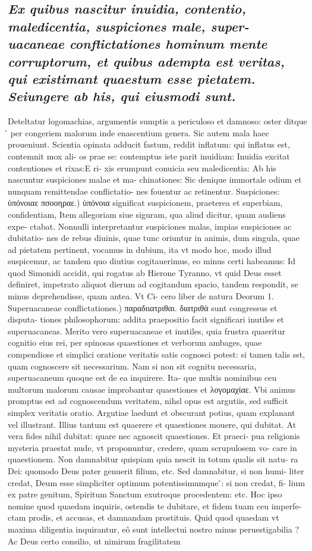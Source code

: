 \documentclass{article}
\begin{document}
\begin{pages}
\subsection*{\textit{Ex quibus nascitur inuidia, contentio, maledicentia, suspiciones male, super- uacaneae conflictationes hominum mente corruptorum, et quibus adempta est veritas, qui existimant quaestum esse pietatem. Seiungere ab his, qui eiusmodi sunt. }}\pstart Deteltatur logomachias, argumentis sumptis a periculoso et damnoso: oster ditque ́ per congeriem malorum inde enascentium genera. Sic autem mala haec proueniunt. Scientia opinata adducit fastum, reddit inflatum: qui inflatus est, contemnit mox ali- os prae se: contemptus iste parit inuidiam: Inuidia excitat contentiones et rixas:E ri- xis erumpunt conuicia seu maledicentia: Ab his nascuntur suspiciones malae et ma- chinationes: Sic denique immortale odium et nunquam remittendae conflictatio- nes fouentur ac retinentur.  \pend\pstart Suspiciones: ὑπόνοιαε πσοοηραε.) ύπόνοια significat suspicionem, praeterea et superbiam, confidentiam, Item allegoriam siue siguram, qua aliud dicitur, quam audiens expe- ctabat. Nonnulli interpretantur suspiciones malas, impias suspiciones ac dubitatio- nes de rebus diuinis, quae tunc oriuntur in animis, dum singula, quae ad pietatem pertinent, vocamus in dubium, ita vt modo hoc, modo illud suspicemur, ac tandem quo diutius cogitauerimus, eo minus certi habeamus: Id quod Simonidi accidit, qui rogatus ab Hierone Tyranno, vt quid Deus esset definiret, impetrato aliquot dierum ad cogitandum spacio, tandem respondit, se minus deprehendisse, quam antea. Vt Ci- cero liber de natura Deorum 1.  \pend\pstart Superuacaneae conflictationes.) παραδιιατριθαι. διατριθὰ sunt congressus et disputa- tiones philosophorum: addita praepositio facit significari inutiles et superuacaneas. Merito vero superuacaneae et inutiles, quia frustra quaeritur cognitio eius rei, per spinosas quaestiones et verborum ambages, quae compendiose et simplici oratione veritatis satis cognosci potest: si tamen talis sst, quam cognoscere sit necessarium. Nam si non sit cognitu necessaria, superuacaneum quoque est de ea inquirere. Ita- que multis nominibus ceu multorum malorum causae improbantur quaestiones et λογομαχίαε. Vbi animus promptus est ad cognoscendum veritatem, nihsl opus est argutiis, sed sufficit simplex veritatis oratio. Argutiae laedunt et obscurant potius, quam explanant vel illustrant. Illius tantum est quaerere et quaestiones mouere, qui dubitat. At vera fides nihil dubitat: quare nec agnoscit quaestiones. Et praeci- pua religionis mysteria praestat nude, vt proponuntur, credere, quam scrupulosem vo- care in quaestionem. Non damnabitur quispiam quia nescit in totum qualis sit natu- ra Dei: quomodo Deus pater genuerit filium, etc. Sed damnabitur, si non humi- liter credat, Deum esse simpliciter optimum potentissimumque ́: si non credat, fi- lium ex patre genitum, Spiritum Sanctum exutroque procedentem: etc. Hoc ipso nomine quod quaedam inquiris, ostendis te dubitare, et fidem tuam ceu imperfe- ctam prodis, et accusas, et damnandam prostituis. Quid quod quaedam vt maxima diligentia inquirantur, eô sunt intellectui nostro minus peruestigabilia ? Ac Deus certo consilio, ut nimirum fragilitatem 
\end{pages}
\end{document}
